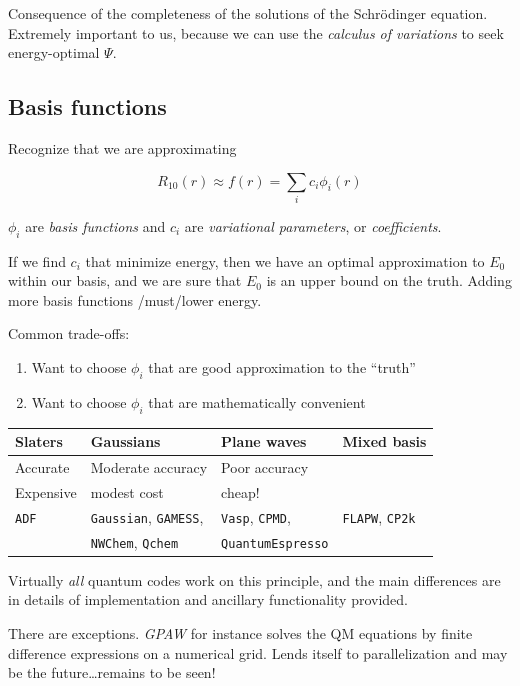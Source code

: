 \documentclass[11pt]{article}
\begin{document}
Consequence of the completeness of the solutions of the Schr\"{o}dinger equation.  Extremely important to us, because we can use the \emph{calculus of variations} to seek energy-optimal \(\Psi\).

\subsection{Basis functions}
\label{sec:org0eb097f}
Recognize that we are approximating

\[R_{10}(r) \approx f(r) = \sum_i c_i \phi_i(r)\]

\(\phi_i\) are \emph{basis functions} and \(c_i\) are \emph{variational parameters}, or \emph{coefficients}.

If we find \(c_i\) that minimize energy, then we have an optimal approximation to \(E_0\) within our basis, and we are sure that \(E_0\) is an upper bound on the truth.  Adding more basis functions /must/lower energy.

Common trade-offs:
\begin{enumerate}
\item Want to choose \(\phi_i\) that are good approximation to the ``truth''
\item Want to choose \(\phi_i\) that are mathematically convenient
\end{enumerate}

\begin{center}
\begin{tabular}{llll}
Slaters & Gaussians & Plane waves & Mixed basis\\
\hline
Accurate & Moderate accuracy & Poor accuracy & \\
Expensive & modest cost & cheap! & \\
\texttt{ADF} & \texttt{Gaussian}, \texttt{GAMESS}, & \texttt{Vasp}, \texttt{CPMD}, & \texttt{FLAPW}, \texttt{CP2k}\\
 & \texttt{NWChem}, \texttt{Qchem} & \texttt{QuantumEspresso} & \\
\end{tabular}
\end{center}

Virtually \emph{all} quantum codes work on this principle, and the main
differences are in details of implementation and ancillary
functionality provided.

There are exceptions. \emph{GPAW} for instance solves the QM equations by finite difference expressions on a numerical grid.  Lends itself to parallelization and may be the future\ldots remains to be seen!
\end{document}
